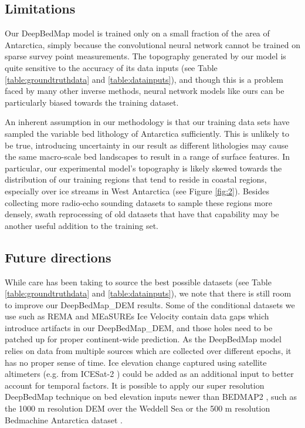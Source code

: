 \documentclass[tc, manuscript]{copernicus}
\begin{document}
\subsection{Limitations}

Our DeepBedMap model is trained only on a small fraction of the area of Antarctica, simply because the convolutional neural network cannot be trained on sparse survey point measurements.
The topography generated by our model is quite sensitive to the accuracy of its data inputs (see Table \ref{table:groundtruthdata} and \ref{table:datainputs}), and though this is a problem faced by many other inverse methods, neural network models like ours can be particularly biased towards the training dataset.

An inherent assumption in our methodology is that our training data sets have sampled the variable bed lithology of Antarctica \citep{CoxGeoMAPdatasetAntarctic2018} sufficiently.
This is unlikely to be true, introducing uncertainty in our result as different lithologies may cause the same macro-scale bed landscapes to result in a range of surface features.
In particular, our experimental model's topography is likely skewed towards the distribution of our training regions that tend to reside in coastal regions, especially over ice streams in West Antarctica (see Figure \ref{fig:2}).
Besides collecting more radio-echo sounding datasets to sample these regions more densely, swath reprocessing of old datasets that have that capability \citep{HolschuhSwathtopographyfuture2019} may be another useful addition to the training set.

\subsection{Future directions}

While care has been taking to source the best possible datasets (see Table \ref{table:groundtruthdata} and \ref{table:datainputs}), we note that there is still room to improve our DeepBedMap\_DEM results.
Some of the conditional datasets we use such as REMA \citep{HowatReferenceElevationModel2019} and MEaSUREs Ice Velocity \citep{RignotMEaSUREsInSARBasedAntarctica2017} contain data gaps which introduce artifacts in our DeepBedMap\_DEM, and those holes need to be patched up for proper continent-wide prediction.
As the DeepBedMap model relies on data from multiple sources which are collected over different epochs, it has no proper sense of time.
Ice elevation change captured using satellite altimeters (e.g. from ICESat-2 \citep{MarkusIceCloudland2017}) could be added as an additional input to better account for temporal factors.
It is possible to apply our super resolution DeepBedMap technique on bed elevation inputs newer than BEDMAP2 \citep{FretwellBedmap2improvedice2013}, such as the 1000 m resolution DEM over the Weddell Sea \citep{Jeofry1KmBedTopography2017} or the 500 m resolution Bedmachine Antarctica dataset \citep{MorlighemMEaSUREsBedMachineAntarctica2019}.
\end{document}

